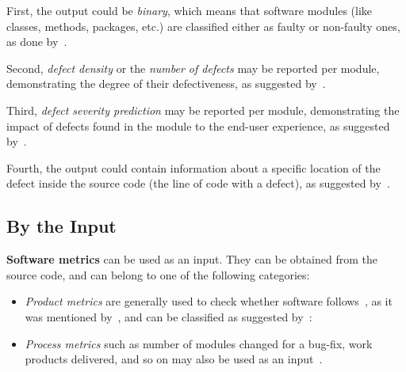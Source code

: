 First, the output could be \emph{binary}, which means that 
software modules (like classes, methods, packages, etc.) are classified
either as faulty or non-faulty ones, as done by~\citet{Gokhale97regressiontree, Menzies04assessingpredictors}.

Second, \emph{defect density} or the \emph{number of defects} 
may be reported per module, demonstrating the degree of their defectiveness,
as suggested by~\citet{Predicting_Fault, JANES20063711, 7510216}.

Third, \emph{defect severity prediction} may be reported per module, demonstrating
the impact of defects found in the module to the end-user experience,
as suggested by~\citet{7510216, SHATNAWI20081868, 1717471}.

Fourth, the output could contain information about a specific location
of the defect inside the source code (the line of code with a defect), 
as suggested by~\citet{vasic2019neural}.

\subsection{By the Input}

\textbf{Software metrics} can be used as an input. 
They can be obtained from the source code,
and can belong to one of the following categories:

\begin{itemize}
\item \emph{Product metrics} are generally used to check 
whether software follows~\citep{InternationalStandardOrganization}, 
as it was mentioned  by~\citet{10.1007/s10462-017-9563-5}, 
and can be classified as suggested by~\citet{10.5555/540137}: 

\item \emph{Process metrics} such as number of modules changed for a bug-fix,
 work products delivered, and so on may also be used
 as an input~\citep{The_IT_Measurement_Compendium, 10.1109/ISSRE.2010.25}.
\end{itemize}

